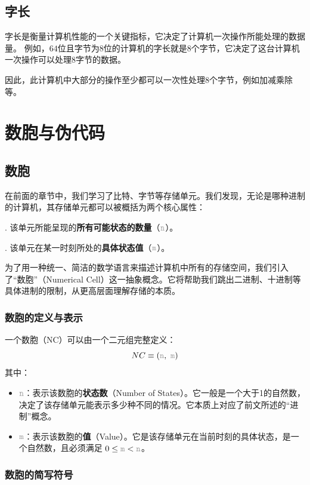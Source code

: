\documentclass[12pt,a4paper,UTF8]{ctexart}
\newcommand{\var}[1]{\textcolor{lightgray}{\mathtt{#1}}}
\begin{document}
\subsection{字长}

\qquad 字长是衡量计算机性能的一个关键指标，它决定了计算机一次操作所能处理的数据量。
例如，$64$位且字节为$8$位的计算机的字长就是$8$个字节，它决定了这台计算机一次操作可以处理$8$字节的数据。

\qquad 因此，此计算机中大部分的操作至少都可以一次性处理$8$个字节，例如加减乘除等。




\newpage
\section{数胞与伪代码}

\subsection{数胞}

\qquad 在前面的章节中，我们学习了比特、字节等存储单元。我们发现，无论是哪种进制的计算机，其存储单元都可以被概括为两个核心属性：

. 该单元所能呈现的\textbf{所有可能状态的数量}（$\var{n}$）。

. 该单元在某一时刻所处的\textbf{具体状态值}（$\var{m}$）。

\qquad 为了用一种统一、简洁的数学语言来描述计算机中所有的存储空间，我们引入了“数胞”（Numerical Cell）这一抽象概念。它将帮助我们跳出二进制、十进制等具体进制的限制，从更高层面理解存储的本质。

\subsubsection{数胞的定义与表示}

\qquad 一个数胞（NC）可以由一个二元组完整定义：
\[
NC \equiv (\var{n},\ \var{m})
\]
其中：
\begin{itemize}
    \item $\var{n}$：表示该数胞的\textbf{状态数}（Number of States）。它一般是一个大于1的自然数，决定了该存储单元能表示多少种不同的情况。它本质上对应了前文所述的“进制”概念。
    \item $\var{m}$：表示该数胞的\textbf{值}（Value）。它是该存储单元在当前时刻的具体状态，是一个自然数，且必须满足 $0 \leq \var{m} < \var{n}$。
\end{itemize}

\subsubsection{数胞的简写符号}
\end{document}
